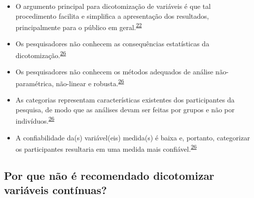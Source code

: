 \documentclass[
]{book}
\begin{document}
\begin{itemize}
\item
  O argumento principal para dicotomização de variáveis é que tal procedimento facilita e simplifica a apresentação dos resultados, principalmente para o público em geral.\textsuperscript{\protect\hyperlink{ref-Fedorov2009}{22}}
\item
  Os pesquisadores não conhecem as consequências estatísticas da dicotomização.\textsuperscript{\protect\hyperlink{ref-MacCallum2002}{26}}
\item
  Os pesquisadores não conhecem os métodos adequados de análise não-paramétrica, não-linear e robusta.\textsuperscript{\protect\hyperlink{ref-MacCallum2002}{26}}
\item
  As categorias representam características existentes dos participantes da pesquisa, de modo que as análises devam ser feitas por grupos e não por indivíduos.\textsuperscript{\protect\hyperlink{ref-MacCallum2002}{26}}
\item
  A confiabilidade da(s) variável(eis) medida(s) é baixa e, portanto, categorizar os participantes resultaria em uma medida mais confiável.\textsuperscript{\protect\hyperlink{ref-MacCallum2002}{26}}
\end{itemize}

\hypertarget{por-que-nuxe3o-uxe9-recomendado-dicotomizar-variuxe1veis-contuxednuas}{%
\subsection{Por que não é recomendado dicotomizar variáveis contínuas?}\label{por-que-nuxe3o-uxe9-recomendado-dicotomizar-variuxe1veis-contuxednuas}}
\end{document}
